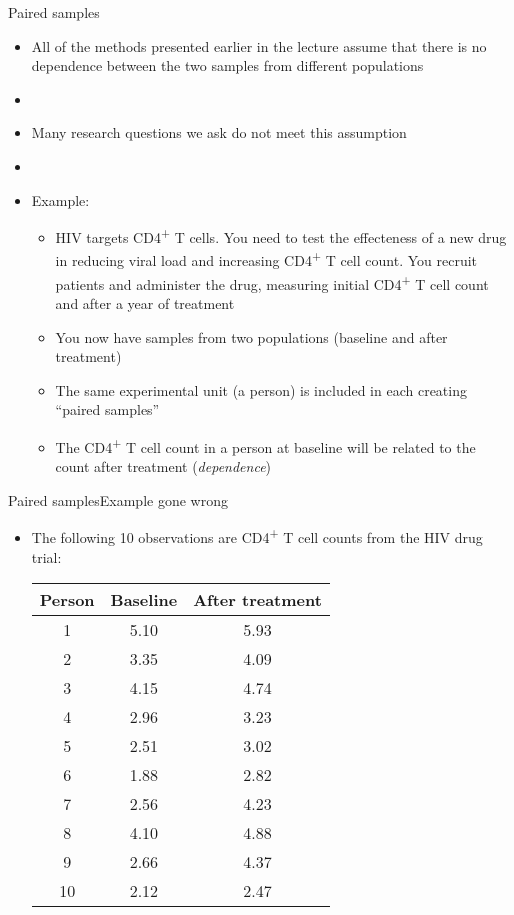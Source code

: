 \documentclass[xcolor=dvipsnames]{beamer}
\begin{document}
\begin{frame}{Paired samples}
\begin{itemize}
	\item All of the methods presented earlier in the lecture assume that there is no dependence between the two samples from different populations \pause
	\item[]
	\item Many research questions we ask do not meet this assumption \pause
	\item[]
	\item Example: 
	\begin{itemize}
		\item HIV targets CD4\textsuperscript{+} T cells. You need to test the effecteness of a new drug in reducing viral load and increasing CD4\textsuperscript{+} T cell count. You recruit patients and administer the drug, measuring initial CD4\textsuperscript{+} T cell count and after a year of treatment \pause
		\item You now have samples from two populations (baseline and after treatment) \pause
		\item The same experimental unit (a person) is included in each creating ``paired samples'' \pause
		\item The CD4\textsuperscript{+} T cell count in a person at baseline will be related to the count after treatment (\emph{dependence})
	\end{itemize}
\end{itemize}
\end{frame}

\begin{frame}{Paired samples}{Example gone wrong}
	\begin{itemize}
		\item The following 10 observations are CD4\textsuperscript{+} T cell counts from the HIV drug trial:
		\begin{center}
	\begin{tabular}{|c|c|c|}
		\hline
		\textbf{Person} & \textbf{Baseline} &  \textbf{After treatment} \\ \hline \hline
		1  &    5.10 &   5.93  \\ \hline 
		2  &    3.35 &   4.09 \\ \hline 
		3  &   4.15  &  4.74  \\ \hline 
		4  &   2.96  &  3.23  \\ \hline 
		5  &    2.51 &   3.02 \\ \hline 
		6  &   1.88  &  2.82  \\ \hline 
		7  &   2.56  &  4.23 \\ \hline 
		8  &    4.10 &   4.88 \\ \hline 
		9  &   2.66  &  4.37  \\ \hline 
		10  &    2.12  &  2.47 \\ \hline 
	\end{tabular}
		\end{center}
	\end{itemize}
\end{frame}
\end{document}
